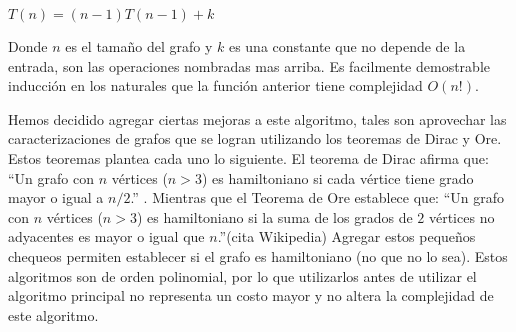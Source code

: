 $T(n) = (n-1)T(n-1) + k$

Donde $n$ es el tamaño del grafo y $k$ es una constante que no depende de la entrada, son las operaciones nombradas mas arriba. Es facilmente demostrable inducción en los naturales que la función anterior tiene complejidad $O(n!)$.

Hemos decidido agregar ciertas mejoras a este algoritmo, tales son aprovechar las caracterizaciones de grafos que se logran utilizando los teoremas de Dirac y Ore. Estos teoremas plantea cada uno lo siguiente. El teorema de Dirac afirma que: ``Un grafo con $n$ vértices ($n > 3$) es hamiltoniano si cada vértice tiene grado mayor o igual a $n/2$.'' . Mientras que el Teorema de Ore establece que: ``Un grafo con $n$ vértices ($n > 3$) es hamiltoniano si la suma de los grados de $2$ vértices no adyacentes es mayor o igual que $n$.''(cita Wikipedia) Agregar estos pequeños chequeos permiten establecer si el grafo es hamiltoniano (no que no lo sea). Estos algoritmos son de orden polinomial, por lo que utilizarlos antes de utilizar el algoritmo principal no representa un costo mayor y no altera la complejidad de este algoritmo.




